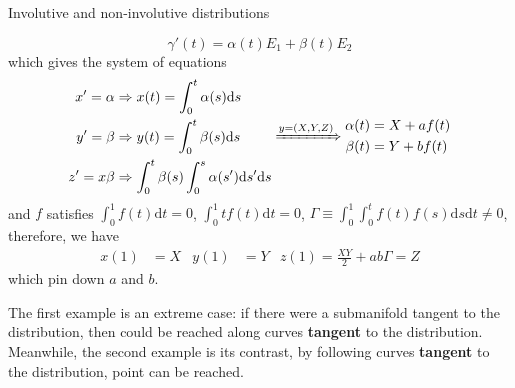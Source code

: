 \begin{example}{Involutive and non-involutive distributions}
\begin{enumerate}
        $$
        \gamma'(t) = \alpha(t)E_1 + \beta(t)E_2
        $$
        which gives the system of equations
        $$
        \begin{aligned}
            x'=\alpha &\Rightarrow x(t)=\int^t_0 \alpha(s)\mathrm{d}s\\
            y'=\beta  &\Rightarrow y(t)=\int^t_0 \beta(s)\mathrm{d}s\\
            z' = x\beta &\Rightarrow \int^t_0 \beta(s) \int^s_0 \alpha(s')\mathrm{d}s' \mathrm{d}s
        \end{aligned} \xRightarrow{y=(X,Y,Z)} \begin{aligned}
            \alpha(t) &= X+af(t)\\
            \beta(t)  &= Y+bf(t)
        \end{aligned}
        $$
        and $f$ satisfies $\int^1_0 f(t)\mathrm{d}t =0$, $\int^1_0 tf(t)\mathrm{d}t = 0$, $ \Gamma \equiv \int^1_0 \int^t_0 f(t)f(s)\mathrm{d}s\mathrm{d}t\neq 0$, therefore, we have 
        \begin{align*}
            x(1) &= X & y(1)&=Y & z(1)=\frac{XY}{2}+ab\Gamma = Z
        \end{align*}
        which pin down $a$ and $b$.
    \end{enumerate}
\end{example}

The first example is an extreme case: if there were a submanifold tangent to the distribution, then  could be reached along curves \textbf{tangent} to the distribution. Meanwhile, the second example is its contrast, by following curves \textbf{tangent} to the distribution,  point can be reached.

